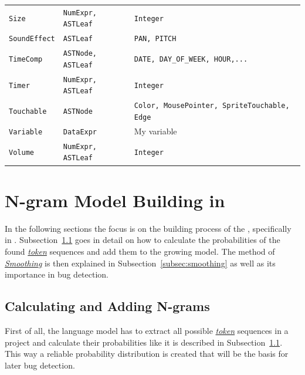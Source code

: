 \begin{table}[hbtp]
\begin{tabular}[t]{lll}
   		\vspace{10pt}
    		\texttt{Size} & \texttt{NumExpr, ASTLeaf} & \texttt{Integer} \\
    		\vspace{10pt}
    		\texttt{SoundEffect} & \texttt{ASTLeaf} & \texttt{PAN, PITCH} \\
    		\vspace{10pt}
    		\texttt{TimeComp} & \texttt{ASTNode, ASTLeaf} & \texttt{DATE, DAY\_OF\_WEEK, HOUR,...} \\
    		\vspace{10pt}
    		\texttt{Timer} & \texttt{NumExpr, ASTLeaf} & \texttt{Integer} \\
    		\vspace{10pt} 
    		\texttt{Touchable} & \texttt{ASTNode} & \parbox[t]{7cm}{\texttt{Color, MousePointer, SpriteTouchable, Edge}} \\
    		\vspace{10pt}
    		\texttt{Variable} & \texttt{DataExpr} & My variable \\ 
    		\vspace{10pt}
        \texttt{Volume} & \texttt{NumExpr, ASTLeaf} & \texttt{Integer} \\     
    \bottomrule
    \end{tabular}
\end{table}


\section{N-gram Model Building in \scratch{}}\label{sec:model}
In the following sections the focus is on the building process of the \ngram{}, specifically in \scratch{}. Subsection~\ref{subsec:n-grams} goes in detail on how to calculate the probabilities of the found \hyperref[def:token]{\textit{token}} sequences and add them to the growing model. The method of \hyperref[def:smoothing]{\textit{Smoothing}} is then explained in Subsection~\ref{subsec:smoothing} as well as its importance in bug detection.

\subsection{Calculating and Adding N-grams}\label{subsec:n-grams}
First of all, the language model has to extract all possible \hyperref[def:token]{\textit{token}} sequences in a \scratch{} project and calculate their probabilities like it is described in Subsection~\ref{subsec:n-grams}. This way a reliable probability distribution is created that will be the basis for later bug detection. 

